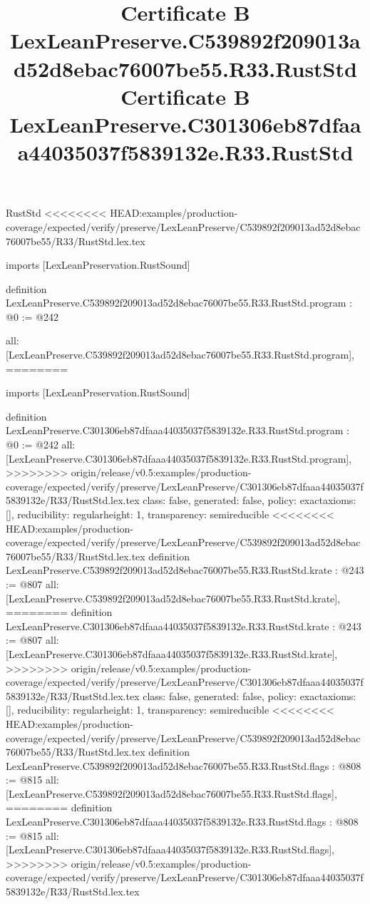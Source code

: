 \begin{lexlean}{RustStd}
<<<<<<<< HEAD:examples/production-coverage/expected/verify/preserve/LexLeanPreserve/C539892f209013ad52d8ebac76007be55/R33/RustStd.lex.tex
\title{Certificate B LexLeanPreserve.C539892f209013ad52d8ebac76007be55.R33.RustStd}
\begin{coremodule}
imports [LexLeanPreservation.RustSound]

definition LexLeanPreserve.C539892f209013ad52d8ebac76007be55.R33.RustStd.program : @0 := @242 {
  all: [LexLeanPreserve.C539892f209013ad52d8ebac76007be55.R33.RustStd.program],
========
\title{Certificate B LexLeanPreserve.C301306eb87dfaaa44035037f5839132e.R33.RustStd}
\begin{coremodule}
imports [LexLeanPreservation.RustSound]

definition LexLeanPreserve.C301306eb87dfaaa44035037f5839132e.R33.RustStd.program : @0 := @242 {
  all: [LexLeanPreserve.C301306eb87dfaaa44035037f5839132e.R33.RustStd.program],
>>>>>>>> origin/release/v0.5:examples/production-coverage/expected/verify/preserve/LexLeanPreserve/C301306eb87dfaaa44035037f5839132e/R33/RustStd.lex.tex
  class: false,
  generated: false,
  policy: exact{axioms: []},
  reducibility: regular{height: 1},
  transparency: semireducible
}
<<<<<<<< HEAD:examples/production-coverage/expected/verify/preserve/LexLeanPreserve/C539892f209013ad52d8ebac76007be55/R33/RustStd.lex.tex
definition LexLeanPreserve.C539892f209013ad52d8ebac76007be55.R33.RustStd.krate : @243 := @807 {
  all: [LexLeanPreserve.C539892f209013ad52d8ebac76007be55.R33.RustStd.krate],
========
definition LexLeanPreserve.C301306eb87dfaaa44035037f5839132e.R33.RustStd.krate : @243 := @807 {
  all: [LexLeanPreserve.C301306eb87dfaaa44035037f5839132e.R33.RustStd.krate],
>>>>>>>> origin/release/v0.5:examples/production-coverage/expected/verify/preserve/LexLeanPreserve/C301306eb87dfaaa44035037f5839132e/R33/RustStd.lex.tex
  class: false,
  generated: false,
  policy: exact{axioms: []},
  reducibility: regular{height: 1},
  transparency: semireducible
}
<<<<<<<< HEAD:examples/production-coverage/expected/verify/preserve/LexLeanPreserve/C539892f209013ad52d8ebac76007be55/R33/RustStd.lex.tex
definition LexLeanPreserve.C539892f209013ad52d8ebac76007be55.R33.RustStd.flags : @808 := @815 {
  all: [LexLeanPreserve.C539892f209013ad52d8ebac76007be55.R33.RustStd.flags],
========
definition LexLeanPreserve.C301306eb87dfaaa44035037f5839132e.R33.RustStd.flags : @808 := @815 {
  all: [LexLeanPreserve.C301306eb87dfaaa44035037f5839132e.R33.RustStd.flags],
>>>>>>>> origin/release/v0.5:examples/production-coverage/expected/verify/preserve/LexLeanPreserve/C301306eb87dfaaa44035037f5839132e/R33/RustStd.lex.tex
}}}
\end{coremodule}}
\end{coremodule}
\end{lexlean}
